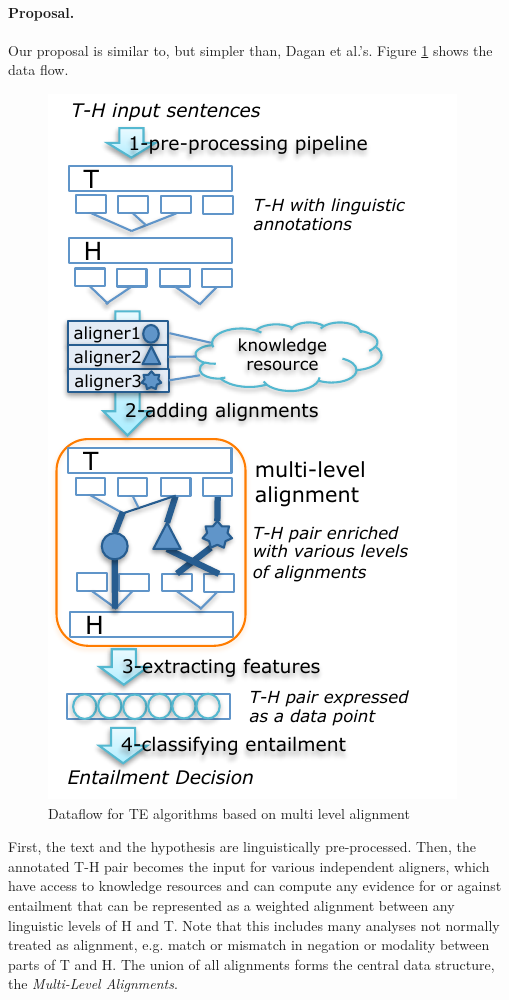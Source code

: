 \documentclass[11pt,letterpaper]{article}
\begin{document}
\paragraph{Proposal.} Our proposal is similar to, but simpler than,
Dagan et al.'s. Figure \ref{fig:1} shows the data flow.

\begin{figure}[t!b]
  \centering
  \includegraphics[width=0.9\columnwidth]{figures/figure1.pdf}
  \caption{Dataflow for TE algorithms based on multi level alignment}
  \label{fig:1}
\end{figure}

First, the text and the hypothesis are linguistically
pre-processed. Then, the annotated T-H pair becomes the input for
various independent aligners, which have access to knowledge resources
and can compute any evidence for or against entailment that can be
represented as a weighted alignment between any linguistic levels of H
and T.
Note that this includes many analyses not normally treated as
alignment, e.g. match or mismatch in negation or modality between
parts of T and H. %
The union of all alignments forms the 
central data structure, the {\em Multi-Level Alignments}.
\end{document}
